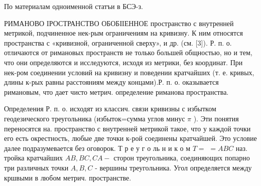 \documentclass[10pt]{article}
\begin{document}
По материалам одноименной статъи в БСЭ-з.



РИМАНОВО IРОСТРАНСТВО ОБОБІІЕННОЕ пространство с внутренней метрикой, подчиненное нек-рым ограничениям на кривизну. К ним относятся пространства с «кривизной, ограниченной сверху», и др. (см. [3]). Р. п. о. отличаются от римановых пространств не только большей общностью, но и тем, что они определяются и исследуются, исходя из метрики, без координат. При нек-ром соединении условий на кривизну и поведении кратчайших (т. е. кривых, длины к-рых равны расстояниям между концами).Р. п. о. оказывается римановым, что дает чисто метрич. определение риманова пространства.



Определения Р. п. о. исходят из классич. связи кривизны с избытком геодезического треугольника (избыток=сумма углов минус $\pi$ ). Эти понятия переносятся на. пространство с внутренней метрикой такое, что у каждой точки его есть окрестность, любые две точки к-рой соединены кратчайшей. Это условие далее подразумевается без оговорок. Т р е у г о ль н и к о м $T=$ $=A B C$ наз. тройка кратчайших $A B, B C, C A-$ сторон треугольника, соединяющих попарно три различных точки $A, B, C$ - вершины треугольника. Угол определяется между кршвыми в любом метрич. пространстве.
\end{document}
